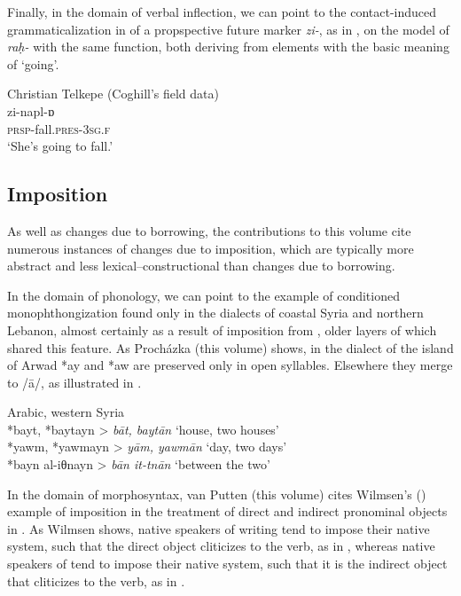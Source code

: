 \documentclass[output=paper]{langsci/langscibook}
\begin{document}
Finally, in the domain of verbal {inflection}, we can point to the {contact-induced grammaticalization} in  of a propspective {future} marker \textit{zi-}, as in , on the model of  \textit{raḥ-} with the same function, both deriving from elements with the basic meaning of `going'.

\ea\label{introgoing}Christian Telkepe  (Coghill’s field data)\\
\gll zi-napl-ɒ\\
     \textsc{prsp-}fall.\textsc{pres}{}-\textsc{3sg.f}\\
\glt ‘She’s going to fall.’
\z

\subsection{Imposition}


As well as changes due to borrowing, the contributions to this volume cite numerous instances of changes due to {imposition}, which are typically more abstract and less lexical--constructional than changes due to borrowing.


In the domain of phonology, we can point to the example of conditioned monophthongization found only in the  dialects of coastal Syria and northern Lebanon, almost certainly as a result of {imposition} from , older layers of which shared this feature. As Procházka (this volume)  shows, in the dialect of the island of Arwad *ay and *aw are preserved only in open syllables. Elsewhere they {merge} to /ā/, as illustrated in .


\ea\label{intromonophth}
{ Arabic, western Syria \citep[278]{Procházka2013}} \\
    *bayt, *baytayn > \textit{bāt, baytān} ‘house, two houses’\\
*yawm, *yawmayn >  \textit{yām, yawmān} ‘day, two days’\\
*bayn al-iθnayn > \textit{bān it-tnān} ‘between the two’\\
\z

In the domain of morphosyntax, van Putten (this volume) cites Wilmsen's (\citeyear{Wilmsen2010}) example of {imposition} in the treatment of direct and indirect pronominal objects in . As Wilmsen shows, native speakers of  writing  tend to impose their native system, such that the direct object cliticizes to the verb, as in , whereas native speakers of   tend to impose their native system, such that it is the indirect object that cliticizes to the verb, as in .
\end{document}
